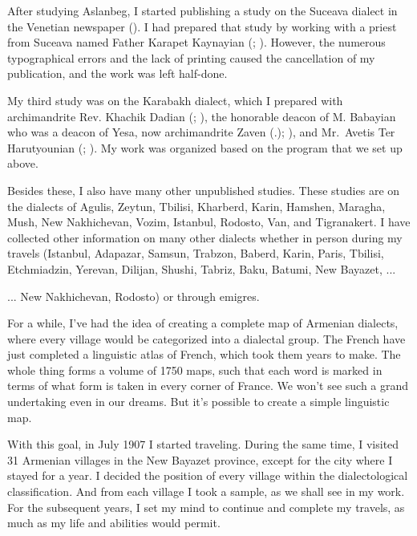 After studying Aslanbeg, I started publishing a study on the Suceava dialect in the Venetian newspaper  (). I had prepared that study by working with a priest from Suceava named Father Karapet Kaynayian (; ). However, the numerous typographical errors and the lack of printing caused the cancellation of my publication, and the work was left half-done.

My third study was on the Karabakh dialect, which I prepared with archimandrite Rev. Khachik Dadian (; ), the honorable deacon of M. Babayian who was a deacon of Yesa, now archimandrite Zaven (.); ), and Mr.~Avetis Ter Harutyounian (; ). My work was organized based on the program that we set up above. 

Besides these, I also have many other unpublished studies. These studies are on the dialects of Agulis, Zeytun, Tbilisi, Kharberd, Karin, Hamshen, Maragha, Mush, New Nakhichevan, Vozim, Istanbul, Rodosto, Van, and Tigranakert. I have collected other information on many other dialects whether in person during my travels (Istanbul, Adapazar, Samsun, Trabzon, Baberd, Karin, Paris, Tbilisi, Etchmiadzin, Yerevan, Dilijan, Shushi, Tabriz, Baku, Batumi, New Bayazet, ... 


\begin{adjarianpage}\label{page:14}\end{adjarianpage}%

... New Nakhichevan, Rodosto) or through emigres. 

For a while, I've had the idea of creating a complete map of Armenian dialects, where every village would be categorized into a dialectal group. The French have just completed a linguistic atlas of French, which took them years to make. The whole thing forms a volume of 1750 maps, such that each word is marked in terms of what form is taken in every corner of France. We won't see such a grand undertaking even in our dreams. But it's possible to create a simple linguistic map.

With this goal, in July 1907 I started traveling. During the same time, I visited 31 Armenian villages in the New Bayazet province, except for the city where I stayed for a year. I decided the position of every village within the dialectological classification. And from each village I took a sample, as we shall see in my work. For the subsequent years, I set my mind to continue and complete my travels, as much as my life and abilities would permit. 

